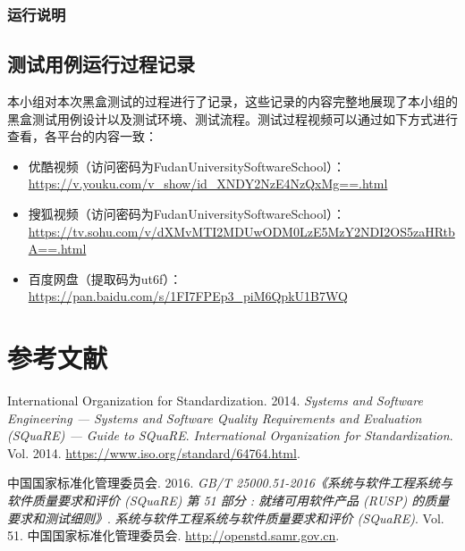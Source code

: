 \documentclass[hyperref, a4paper]{ctexart}
\providecommand{\tightlist}{%
  \setlength{\itemsep}{0pt}\setlength{\parskip}{0pt}}
\begin{document}
\hypertarget{ux8fd0ux884cux8bf4ux660e}{%
\subsubsection{运行说明}\label{ux8fd0ux884cux8bf4ux660e}}

\hypertarget{ux6d4bux8bd5ux7528ux4f8bux8fd0ux884cux8fc7ux7a0bux8bb0ux5f55}{%
\subsection{测试用例运行过程记录}\label{ux6d4bux8bd5ux7528ux4f8bux8fd0ux884cux8fc7ux7a0bux8bb0ux5f55}}

本小组对本次黑盒测试的过程进行了记录，这些记录的内容完整地展现了本小组的黑盒测试用例设计以及测试环境、测试流程。测试过程视频可以通过如下方式进行查看，各平台的内容一致：

\begin{itemize}
\tightlist
\item
  优酷视频（访问密码为FudanUniversitySoftwareSchool）：\url{https://v.youku.com/v_show/id_XNDY2NzE4NzQxMg==.html}
\item
  搜狐视频（访问密码为FudanUniversitySoftwareSchool）：\url{https://tv.sohu.com/v/dXMvMTI2MDUwODM0LzE5MzY2NDI2OS5zaHRtbA==.html}
\item
  百度网盘（提取码为ut6f）：\url{https://pan.baidu.com/s/1FI7FPEp3_piM6QpkU1B7WQ}
\end{itemize}

\pagebreak

\hypertarget{ux53c2ux8003ux6587ux732e}{%
\section*{参考文献}\label{ux53c2ux8003ux6587ux732e}}

\hypertarget{refs}{}
\leavevmode\hypertarget{ref-innovativeInternationalisation}{}%
International Organization for Standardization. 2014. \emph{Systems and
Software Engineering --- Systems and Software Quality Requirements and
Evaluation (SQuaRE) --- Guide to SQuaRE}. \emph{International
Organization for Standardization}. Vol. 2014.
\url{https://www.iso.org/standard/64764.html}.

\leavevmode\hypertarget{ref-innovative1}{}%
中国国家标准化管理委员会. 2016. \emph{GB/T
25000.51-2016《系统与软件工程系统与软件质量要求和评价 (SQuaRE) 第 51
部分 : 就绪可用软件产品 (RUSP) 的质量要求和测试细则》}.
\emph{系统与软件工程系统与软件质量要求和评价 (SQuaRE)}. Vol. 51.
中国国家标准化管理委员会. \url{http://openstd.samr.gov.cn}.
\end{document}
